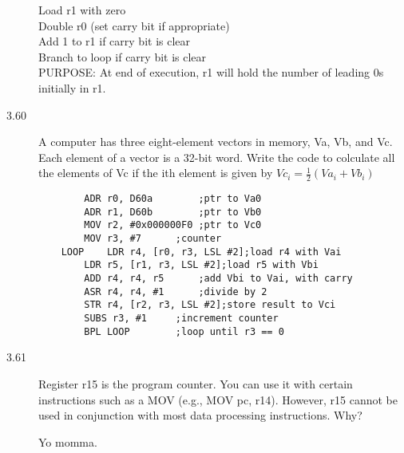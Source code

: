 \documentclass[letterpaper,10pt,titlepage]{article}
\begin{document}
\begin{description}
    Load r1 with zero\\
    Double r0 (set carry bit if appropriate)\\
    Add 1 to r1 if carry bit is clear\\
    Branch to loop if carry bit is clear\\
    PURPOSE: At end of execution, r1 will hold the number of leading 0s initially in r1.
    \item[3.60] A computer has three eight-element vectors in memory, Va, Vb, and Vc. Each element of a vector is a 32-bit word. Write the code to colculate all the elements of Vc if the ith element is given by $Vc_i = \frac{1}{2}(Va_i + Vb_i)$
    
    \begin{lstlisting}
		ADR r0, D60a		;ptr to Va0
		ADR r1, D60b		;ptr to Vb0
		MOV r2, #0x000000F0	;ptr to Vc0
		MOV r3, #7		;counter
	LOOP	LDR r4, [r0, r3, LSL #2];load r4 with Vai
		LDR r5, [r1, r3, LSL #2];load r5 with Vbi
		ADD r4, r4, r5		;add Vbi to Vai, with carry
		ASR r4, r4, #1		;divide by 2
		STR r4, [r2, r3, LSL #2];store result to Vci
		SUBS r3, #1		;increment counter
		BPL LOOP		;loop until r3 == 0
    \end{lstlisting}
    \item[3.61] Register r15 is the program counter. You can use it with certain instructions such as a MOV (e.g., MOV  pc, r14). However, r15 cannot be used in conjunction with most data processing instructions. Why?
    
    Yo momma.
\end{description}
\end{document}
